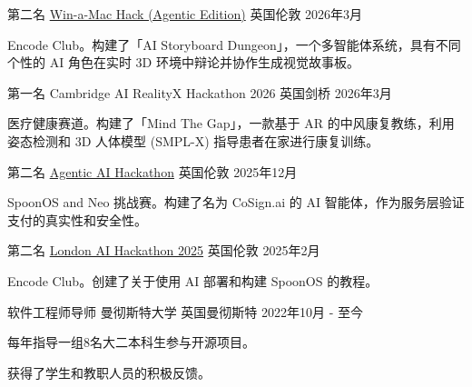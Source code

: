 
\begin{cventries}

    \cventry
    {第二名} %
    {\href{https://www.encodeclub.com/}{Win-a-Mac Hack (Agentic Edition)}} %
    {英国伦敦} %
    {2026年3月} %
    {
    \begin{cvitems} %
        \item {Encode Club。构建了「AI Storyboard Dungeon」，一个多智能体系统，具有不同个性的 AI 角色在实时 3D 环境中辩论并协作生成视觉故事板。}
    \end{cvitems}
    }

    \cventry
    {第一名} %
    {Cambridge AI RealityX Hackathon 2026} %
    {英国剑桥} %
    {2026年3月} %
    {
    \begin{cvitems} %
        \item {医疗健康赛道。构建了「Mind The Gap」，一款基于 AR 的中风康复教练，利用姿态检测和 3D 人体模型 (SMPL-X) 指导患者在家进行康复训练。}
    \end{cvitems}
    }

    \cventry
    {第二名} %
    {\href{https://www.encodeclub.com/}{Agentic AI Hackathon}} %
    {英国伦敦} %
    {2025年12月} %
    {
    \begin{cvitems} %
        \item {SpoonOS and Neo 挑战赛。构建了名为 CoSign.ai 的 AI 智能体，作为服务层验证支付的真实性和安全性。}
    \end{cvitems}
    }

    \cventry
    {第二名} %
    {\href{https://www.encodeclub.com/}{London AI Hackathon 2025}} %
    {英国伦敦} %
    {2025年2月} %
    {
    \begin{cvitems} %
        \item {Encode Club。创建了关于使用 AI 部署和构建 SpoonOS 的教程。}
    \end{cvitems}
    }

    \cventry
    {软件工程师导师} %
    {曼彻斯特大学} %
    {英国曼彻斯特} %
    {2022年10月 - 至今} %
    {
    \begin{cvitems} %
        \item {每年指导一组8名大二本科生参与开源项目。}
        \item {获得了学生和教职人员的积极反馈。}
    \end{cvitems}
    }


\end{cventries}
